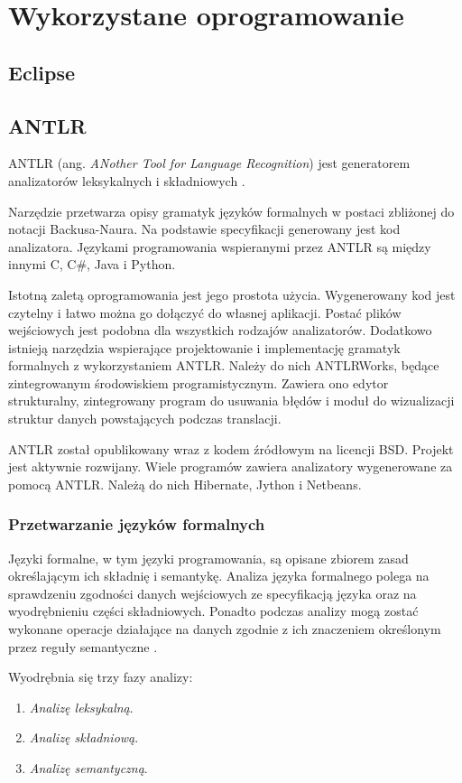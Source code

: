 \chapter{Wykorzystane oprogramowanie}
\section{Eclipse}

\section{ANTLR}
ANTLR (ang. \emph{ANother Tool for Language Recognition}) jest generatorem
analizatorów leksykalnych i składniowych \cite{antlr}.

Narzędzie przetwarza opisy gramatyk języków formalnych w postaci 
zbliżonej do notacji
 Backusa-Naura. Na podstawie specyfikacji generowany jest kod analizatora.
Językami programowania wspieranymi przez ANTLR są między innymi C, C\#, Java
i Python.

Istotną zaletą oprogramowania jest jego prostota użycia. Wygenerowany kod 
jest czytelny i łatwo można go dołączyć do własnej aplikacji. Postać plików
wejściowych jest podobna dla wszystkich rodzajów analizatorów. Dodatkowo
istnieją narzędzia wspierające projektowanie i implementację gramatyk
formalnych z wykorzystaniem ANTLR. Należy do nich ANTLRWorks, będące
zintegrowanym środowiskiem programistycznym. Zawiera ono edytor strukturalny,
zintegrowany program do usuwania błędów i moduł do wizualizacji struktur 
danych powstających podczas translacji.

ANTLR został opublikowany wraz z kodem źródłowym na licencji BSD. Projekt jest
aktywnie rozwijany. Wiele programów zawiera analizatory wygenerowane za pomocą
ANTLR. Należą do nich Hibernate, Jython i Netbeans.

\subsection{Przetwarzanie języków formalnych}
Języki formalne, w tym języki programowania, są opisane zbiorem zasad określającym
ich składnię i semantykę. Analiza języka formalnego polega na sprawdzeniu zgodności
danych wejściowych ze specyfikacją języka oraz na wyodrębnieniu części składniowych.
Ponadto podczas analizy mogą zostać wykonane operacje działające na danych zgodnie
z ich znaczeniem określonym przez reguły semantyczne \cite{compilers}.

Wyodrębnia się trzy fazy analizy:
\begin{enumerate}
\item \emph{Analizę leksykalną}.
\item \emph{Analizę składniową}.
\item \emph{Analizę semantyczną}.
\end{enumerate}

